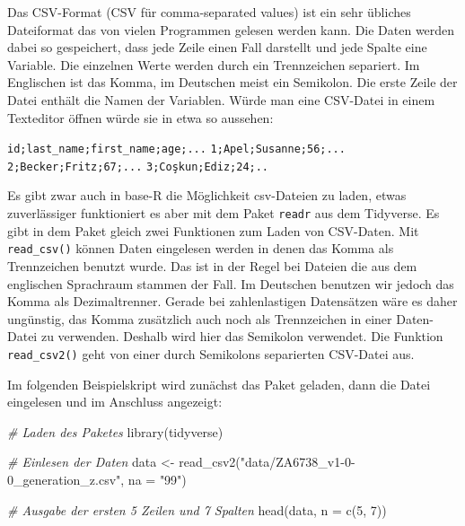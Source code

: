 \documentclass[
]{book}
\newenvironment{Shaded}{\begin{snugshade}}{\end{snugshade}}
\newcommand{\AttributeTok}[1]{\textcolor[rgb]{0.77,0.63,0.00}{#1}}
\newcommand{\CommentTok}[1]{\textcolor[rgb]{0.56,0.35,0.01}{\textit{#1}}}
\newcommand{\DecValTok}[1]{\textcolor[rgb]{0.00,0.00,0.81}{#1}}
\newcommand{\FunctionTok}[1]{\textcolor[rgb]{0.00,0.00,0.00}{#1}}
\newcommand{\NormalTok}[1]{#1}
\newcommand{\OtherTok}[1]{\textcolor[rgb]{0.56,0.35,0.01}{#1}}
\newcommand{\StringTok}[1]{\textcolor[rgb]{0.31,0.60,0.02}{#1}}
\begin{document}
Das CSV-Format (CSV für comma-separated values) ist ein sehr übliches Dateiformat das von vielen Programmen gelesen werden kann. Die Daten werden dabei so gespeichert, dass jede Zeile einen Fall darstellt und jede Spalte eine Variable. Die einzelnen Werte werden durch ein Trennzeichen separiert. Im Englischen ist das Komma, im Deutschen meist ein Semikolon. Die erste Zeile der Datei enthält die Namen der Variablen. Würde man eine CSV-Datei in einem Texteditor öffnen würde sie in etwa so aussehen:

\texttt{id;last\_name;first\_name;age;...}
\texttt{1;Apel;Susanne;56;...}
\texttt{2;Becker;Fritz;67;...}
\texttt{3;Coşkun;Ediz;24;..}

Es gibt zwar auch in base-R die Möglichkeit csv-Dateien zu laden, etwas zuverlässiger funktioniert es aber mit dem Paket \texttt{readr} aus dem Tidyverse. Es gibt in dem Paket gleich zwei Funktionen zum Laden von CSV-Daten. Mit \texttt{read\_csv()} können Daten eingelesen werden in denen das Komma als Trennzeichen benutzt wurde. Das ist in der Regel bei Dateien die aus dem englischen Sprachraum stammen der Fall. Im Deutschen benutzen wir jedoch das Komma als Dezimaltrenner. Gerade bei zahlenlastigen Datensätzen wäre es daher ungünstig, das Komma zusätzlich auch noch als Trennzeichen in einer Daten-Datei zu verwenden. Deshalb wird hier das Semikolon verwendet. Die Funktion \texttt{read\_csv2()} geht von einer durch Semikolons separierten CSV-Datei aus.

Im folgenden Beispielskript wird zunächst das Paket geladen, dann die Datei eingelesen und im Anschluss angezeigt:

\begin{Shaded}
\begin{Highlighting}[]
\CommentTok{\# Laden des Paketes}
\FunctionTok{library}\NormalTok{(tidyverse)}

\CommentTok{\# Einlesen der Daten}
\NormalTok{data }\OtherTok{\textless{}{-}} \FunctionTok{read\_csv2}\NormalTok{(}\StringTok{"data/ZA6738\_v1{-}0{-}0\_generation\_z.csv"}\NormalTok{, }\AttributeTok{na =} \StringTok{"99"}\NormalTok{)}
\end{Highlighting}
\end{Shaded}

\begin{Shaded}
\begin{Highlighting}[]
\CommentTok{\# Ausgabe der ersten 5 Zeilen und 7 Spalten}
\FunctionTok{head}\NormalTok{(data, }\AttributeTok{n =} \FunctionTok{c}\NormalTok{(}\DecValTok{5}\NormalTok{, }\DecValTok{7}\NormalTok{))}
\end{Highlighting}
\end{Shaded}
\end{document}
